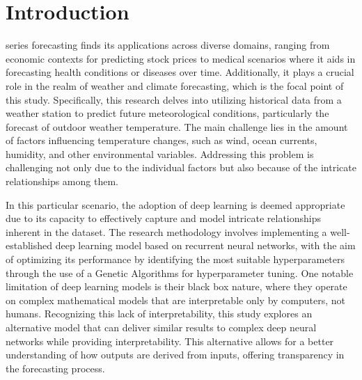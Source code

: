 
\section{Introduction}
 series forecasting finds its applications across diverse domains, ranging from economic contexts for predicting stock prices to medical scenarios where it aids in forecasting health conditions or diseases over time. Additionally, it plays a crucial role in the realm of weather and climate forecasting, which is the focal point of this study. Specifically, this research delves into utilizing historical data from a weather station to predict future meteorological conditions, particularly the forecast of outdoor weather temperature. The main challenge lies in the amount of factors influencing temperature changes, such as wind, ocean currents, humidity, and other environmental variables. Addressing this problem is challenging not only due to the individual factors but also because of the intricate relationships among them.

In this particular scenario, the adoption of deep learning is deemed appropriate due to its capacity to effectively capture and model intricate relationships inherent in the dataset. The research methodology involves implementing a well-established deep learning model based on recurrent neural networks, with the aim of optimizing its performance by identifying the most suitable hyperparameters through the use of a Genetic Algorithms\cite{genetic-algorithms} for hyperparameter tuning. One notable limitation of deep learning models is their black box nature, where they operate on complex mathematical models that are interpretable only by computers, not humans. Recognizing this lack of interpretability, this study explores an alternative model that can deliver similar results to complex deep neural networks while providing interpretability. This alternative allows for a better understanding of how outputs are derived from inputs, offering transparency in the forecasting process.

